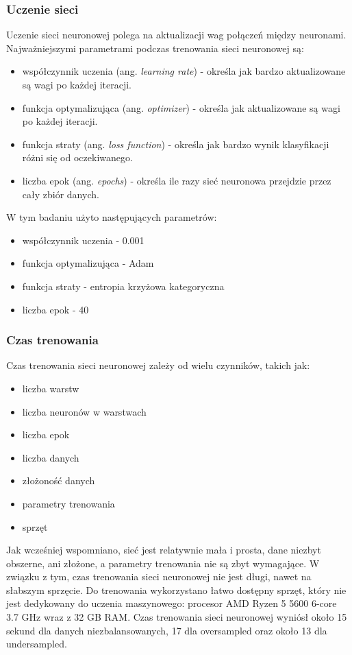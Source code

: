 \subsubsection{Uczenie sieci}\label{subsubsec:uczenie_sieci}
Uczenie sieci neuronowej polega na aktualizacji wag połączeń między neuronami.
Najważniejszymi parametrami podczas trenowania sieci neuronowej są:
\begin{itemize}
    \item współczynnik uczenia (ang. \textit{learning rate}) - określa jak bardzo aktualizowane są wagi po każdej iteracji.
    \item funkcja optymalizująca (ang. \textit{optimizer}) - określa jak aktualizowane są wagi po każdej iteracji.
    \item funkcja straty (ang. \textit{loss function}) - określa jak bardzo wynik klasyfikacji różni się od oczekiwanego.
    \item liczba epok (ang. \textit{epochs}) - określa ile razy sieć neuronowa przejdzie przez cały zbiór danych.
\end{itemize}
W tym badaniu użyto następujących parametrów:
\begin{itemize}
    \item współczynnik uczenia - 0.001
    \item funkcja optymalizująca - Adam
    \item funkcja straty - entropia krzyżowa kategoryczna
    \item liczba epok - 40
\end{itemize}
\subsubsection{Czas trenowania}\label{subsubsec:czas_trenowania_nn}
Czas trenowania sieci neuronowej zależy od wielu czynników, takich jak:
\begin{itemize}
    \item liczba warstw
    \item liczba neuronów w warstwach
    \item liczba epok
    \item liczba danych
    \item złożoność danych
    \item parametry trenowania
    \item sprzęt
\end{itemize}
Jak wcześniej wspomniano, sieć jest relatywnie mała i prosta, dane niezbyt obszerne, ani złożone, a parametry trenowania nie są zbyt wymagające.
W związku z tym, czas trenowania sieci neuronowej nie jest długi, nawet na słabszym sprzęcie.
Do trenowania wykorzystano łatwo dostępny sprzęt, który nie jest dedykowany do uczenia maszynowego: procesor AMD Ryzen 5 5600 6-core 3.7 GHz wraz z 32 GB RAM.
Czas trenowania sieci neuronowej wyniósł około 15 sekund dla danych niezbalansowanych, 17 dla oversampled oraz około 13 dla undersampled.
